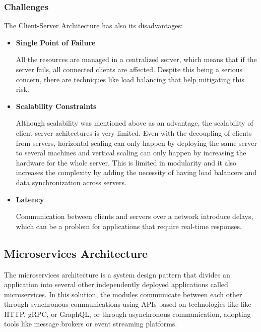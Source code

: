 \subsubsection{Challenges}
The Client-Server Architecture has also its disadvantages:
\begin{itemize}
	\item \textbf{Single Point of Failure}

	      All the resources are managed in a centralized server, which means that if
	      the server fails, all connected clients are affected. Despite this being a
	      serious concern, there are techniques like load balancing that help
	      mitigating this risk.

	\item \textbf{Scalability Constraints}

	      Although scalability was mentioned above as an advantage, the scalability
	      of client-server achitectures is very limited. Even with the decoupling of
	      clients from servers, horizontal scaling can only happen by deploying the
	      same server to several machines and vertical scaling can only happen by
	      increasing the hardware for the whole server. This is limited in modularity
	      and it also increases the complexity by adding the necessity of having
	      load balancers and data synchronization across servers.

	\item \textbf{Latency}

	      Communication between clients and servers over a network introduce delays,
	      which can be a problem for applications that require real-time
	      responses.

\end{itemize}

\subsection{Microservices Architecture}
The microservices architecture is a system design pattern that divides an
application into several other independently deployed applications called
microservices\cite{7436659}.
In this solution, the modules communicate between each other through
synchronous communications using \gls{API}s based on technologies like like
\gls{HTTP}, \gls{gRPC}, or GraphQL, or through asynchronous communication,
adopting tools like message brokers or event streaming platforms\cite{7436659}.


